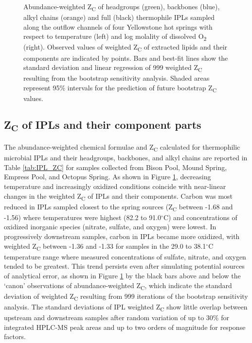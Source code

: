 {\begin{figure}[h]
\begin{subfigure}[b]{0.18\linewidth}
    \end{subfigure}
\caption[Abundance-weighted Z\textsubscript{C} of IPLs and their component parts]{Abundance-weighted Z\textsubscript{C} of headgroups (green), backbones (blue), alkyl chains (orange) and full (black) thermophile IPLs sampled along the outflow channels of four Yellowstone hot springs with respect to temperature (left) and log molality of dissolved O\textsubscript{2} (right). Observed values of weighted Z\textsubscript{C} of extracted lipids and their components are indicated by points. Bars and best-fit lines show the standard deviation and linear regression of 999 weighted Z\textsubscript{C} resulting from the bootstrap sensitivity analysis. Shaded areas represent 95\% intervals for the prediction of future bootstrap Z\textsubscript{C} values.}
\label{fig:weighted_ZC}
\end{figure}
\doublespace
\clearpage
}

\subsection{Z\textsubscript{C} of IPLs and their component parts}

The abundance-weighted chemical formulae and Z\textsubscript{C} calculated for thermophilic microbial IPLs and their headgroups, backbones, and alkyl chains are reported in Table \ref{tab:IPL_ZC} for samples collected from Bison Pool, Mound Spring, Empress Pool, and Octopus Spring. As shown in Figure \ref{fig:weighted_ZC}, decreasing temperature and increasingly oxidized conditions coincide with near-linear changes in the weighted Z\textsubscript{C} of IPLs and their components. Carbon was most reduced in IPLs sampled closest to the spring sources (Z\textsubscript{C} between -1.68 and -1.56) where temperatures were highest (82.2 to 91.0$^\circ$C) and concentrations of oxidized inorganic species (nitrate, sulfate, and oxygen) were lowest. In progressively downstream samples, carbon in IPLs became more oxidized, with weighted Z\textsubscript{C} between -1.36 and -1.33 for samples in the 29.0 to 38.1$^\circ$C temperature range where measured concentrations of sulfate, nitrate, and oxygen tended to be greatest. This trend persists even after simulating potential sources of analytical error, as shown in Figure \ref{fig:weighted_ZC} by the black bars above and below the `canon' observations of abundance-weighted Z\textsubscript{C}, which indicate the standard deviation of weighted Z\textsubscript{C} resulting from 999 iterations of the bootstrap sensitivity analysis. The standard deviations of IPL weighted Z\textsubscript{C} show little overlap between upstream and downstream samples after random variation of up to 30\% for integrated HPLC-MS peak areas and up to two orders of magnitude for response factors.

